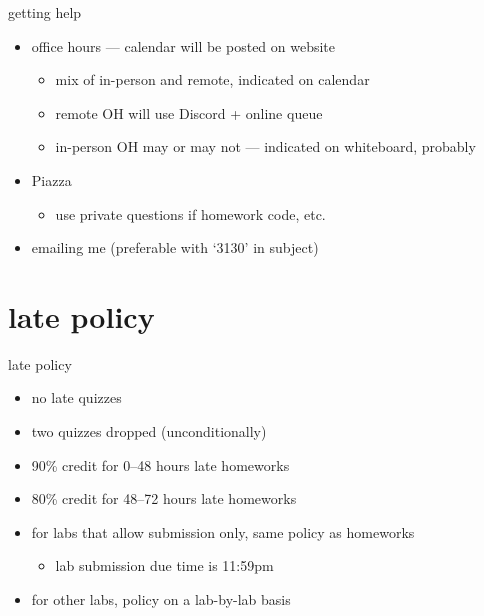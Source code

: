 \begin{frame}{getting help}
    \begin{itemize}
    \item office hours --- calendar will be posted on website
        \begin{itemize}
        \item mix of in-person and remote, indicated on calendar
        \item remote OH will use Discord + online queue
        \item in-person OH may or may not --- indicated on whiteboard, probably
        \end{itemize}
    \item Piazza
        \begin{itemize}
        \item use private questions if homework code, etc.
        \end{itemize}
    \item emailing me (preferable with `3130' in subject)
    \end{itemize}
\end{frame}


\section{late policy}

\begin{frame}{late policy}
    \begin{itemize}
    \item no late quizzes
    \item two quizzes dropped (unconditionally)
    \vspace{.5cm}
    \item 90\% credit for 0--48 hours late homeworks
    \item 80\% credit for 48--72 hours late homeworks
    \vspace{.5cm}
    \item for labs that allow submission only, same policy as homeworks
        \begin{itemize}
        \item lab submission due time is 11:59pm
        \end{itemize}
    \item for other labs, policy on a lab-by-lab basis
    \end{itemize}
\end{frame}


